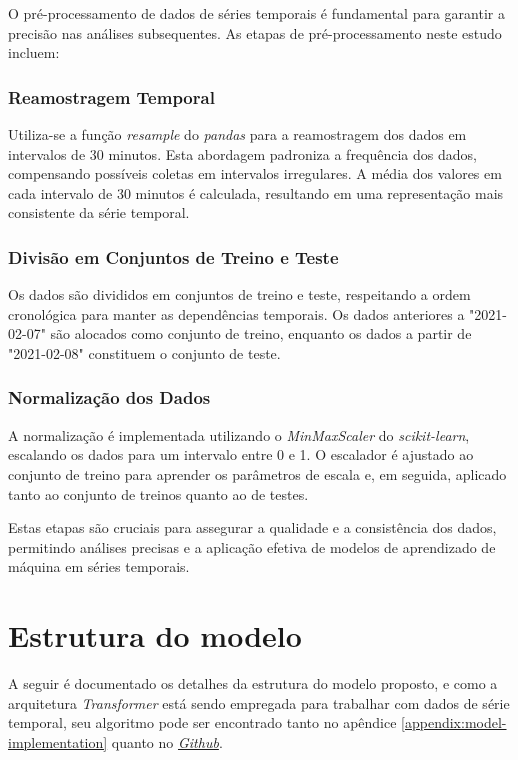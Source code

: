 O pré-processamento de dados de séries temporais é fundamental para garantir a precisão nas análises subsequentes. As etapas de pré-processamento neste estudo incluem:

\subsubsection{Reamostragem Temporal}
Utiliza-se a função \textit{resample} do \textit{pandas} para a reamostragem dos dados em intervalos de 30 minutos. Esta abordagem padroniza a frequência dos dados, compensando possíveis coletas em intervalos irregulares. A média dos valores em cada intervalo de 30 minutos é calculada, resultando em uma representação mais consistente da série temporal.

\subsubsection{Divisão em Conjuntos de Treino e Teste}
Os dados são divididos em conjuntos de treino e teste, respeitando a ordem cronológica para manter as dependências temporais. Os dados anteriores a "2021-02-07" são alocados como conjunto de treino, enquanto os dados a partir de "2021-02-08" constituem o conjunto de teste.

\subsubsection{Normalização dos Dados}
A normalização é implementada utilizando o \textit{MinMaxScaler} do \textit{scikit-learn}, escalando os dados para um intervalo entre 0 e 1. O escalador é ajustado ao conjunto de treino para aprender os parâmetros de escala e, em seguida, aplicado tanto ao conjunto de treinos quanto ao de testes.

Estas etapas são cruciais para assegurar a qualidade e a consistência dos dados, permitindo análises precisas e a aplicação efetiva de modelos de aprendizado de máquina em séries temporais.


\section{Estrutura do modelo}
A seguir é documentado os detalhes da estrutura do modelo proposto, e como a arquitetura \textit{Transformer} está sendo empregada para trabalhar com dados de série temporal, seu algoritmo pode ser encontrado tanto no apêndice \ref{appendix:model-implementation} quanto no \href{https://github.com/weslleyrosalem/dissertacao}{\textit{Github}}.

